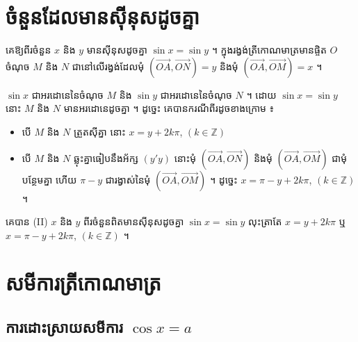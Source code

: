 \section{ចំនួនដែលមានស៊ីនុសដូចគ្នា}

គេឱ្យពីរចំនួន $x$ និង $y$ មានស៊ីនុសដូចគ្នា $\sin x = \sin y$ ។ ក្នុងរង្វង់ត្រីកោណមាត្រមានផ្ចិត $O$ ចំណុច $M$ និង $N$ ជានៅលើរង្វង់ដែលមុំ $(\overrightarrow{OA}, \overrightarrow{ON}) = y$ និងមុំ $(\overrightarrow{OA}, \overrightarrow{OM}) = x$ ។
\begin{center}
\end{center}
$\sin x$ ជាអរដោនេនៃចំណុច $M$ និង $\sin y$ ជាអរដោនេនៃចំណុច $N$ ។ ដោយ $\sin x = \sin y$ នោះ $M$ និង $N$ មានអរដោនេដូចគ្នា ។ ដូច្នេះ គេបានករណីពីរដូចខាងក្រោម ៖
\begin{itemize}
  \item បើ $M$ និង $N$ ត្រួតស៊ីគ្នា នោះ $x = y + 2k\pi$, $(k \in \mathbb{Z})$
  \item បើ $M$ និង $N$ ឆ្លុះគ្នាធៀបនឹងអ័ក្ស $(y'y)$ នោះមុំ $(\overrightarrow{OA}, \overrightarrow{ON})$ និងមុំ $(\overrightarrow{OA}, \overrightarrow{OM})$ ជាមុំបន្ថែមគ្នា ហើយ $\pi - y$ ជារង្វាស់នៃមុំ $(\overrightarrow{OA}, \overrightarrow{OM})$ ។ ដូច្នេះ $x = \pi - y + 2k\pi$, $(k \in \mathbb{Z})$ ។
\end{itemize}
\begin{formulaBox}[ជាទូទៅ]
គេបាន (II) $x$ និង $y$ ពីរចំនួនពិតមានស៊ីនុសដូចគ្នា $\sin x = \sin y$ លុះត្រាតែ $x = y + 2k\pi$ ឬ $x = \pi - y + 2k\pi$, $(k \in \mathbb{Z})$ ។
\end{formulaBox}

\section{សមីការត្រីកោណមាត្រ}

\subsection{ការដោះស្រាយសមីការ \texorpdfstring{$\cos x = a$}{cos x = a}}

